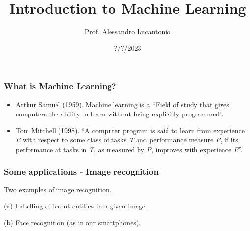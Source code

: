 \documentclass{beamer}
\title{Introduction to Machine Learning}
\author{Prof. Alessandro Lucantonio}
\institute{Aarhus University - Department of Mechanical and Production Engineering}
\date{?/?/2023}
\begin{document}
	
	\frame{\titlepage}
	
	\begin{frame}
		\frametitle{What is Machine Learning?}
		\begin{itemize}
			\item Arthur Samuel (1959). Machine learning is a “Field of study that gives computers the ability to learn without being explicitly programmed”.
			\item Tom Mitchell (1998). “A computer program is said to learn from experience \textit{E} with respect to some class of tasks \textit{T} and performance measure \textit{P}, if its performance at tasks in \textit{T}, as measured by \textit{P}, improves with experience \textit{E}”.
		\end{itemize}
		
	\end{frame}

	\begin{frame}		
		\frametitle{Some applications - Image recognition}
		\begin{figure}
			\centering
			\qquad
		\end{figure}
	Two examples of image recognition. 
	
	(a) Labelling different entities in a given image. 
	
	(b) Face recognition (as in our smartphones).
	\end{frame}
\end{document}
